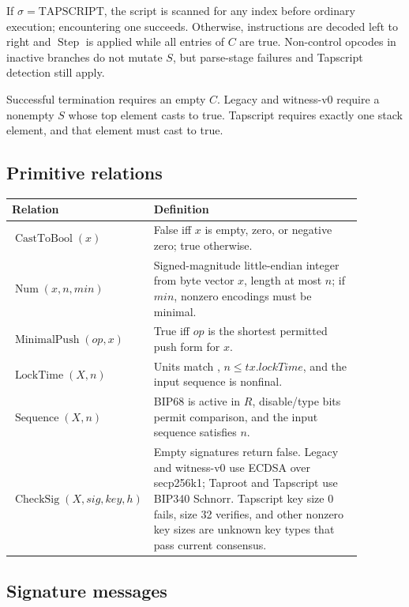 If \(\sigma=\mathrm{TAPSCRIPT}\), the script is scanned for any
 index before ordinary execution; encountering one succeeds.
Otherwise, instructions are decoded left to right and \(\operatorname{Step}\)
is applied while all entries of \(C\) are true. Non-control opcodes in inactive
branches do not mutate \(S\), but parse-stage failures and Tapscript
 detection still apply.

Successful termination requires an empty \(C\). Legacy and witness-v0 require a
nonempty \(S\) whose top element casts to true. Tapscript requires exactly one
stack element, and that element must cast to true.

\subsection{Primitive relations}

\begin{longtable}{@{}L{0.28\linewidth}L{0.60\linewidth}@{}}
\toprule
Relation & Definition \\
\midrule
\(\operatorname{CastToBool}(x)\) & False iff \(x\) is empty, zero, or negative zero; true otherwise. \\
\(\operatorname{Num}(x,n,min)\) & Signed-magnitude little-endian integer from byte vector \(x\), length at most \(n\); if \(min\), nonzero encodings must be minimal. \\
\(\operatorname{MinimalPush}(op,x)\) & True iff \(op\) is the shortest permitted push form for \(x\). \\
\(\operatorname{LockTime}(X,n)\) & Units match , \(n\le tx.lockTime\), and the input sequence is nonfinal. \\
\(\operatorname{Sequence}(X,n)\) & BIP68 is active in \(R\), disable/type bits permit comparison, and the input sequence satisfies \(n\). \\
\(\operatorname{CheckSig}(X,sig,key,h)\) & Empty signatures return false. Legacy and witness-v0 use ECDSA over secp256k1; Taproot and Tapscript use BIP340 Schnorr. Tapscript key size 0 fails, size 32 verifies, and other nonzero key sizes are unknown key types that pass current consensus. \\
\bottomrule
\end{longtable}

\subsection{Signature messages}

